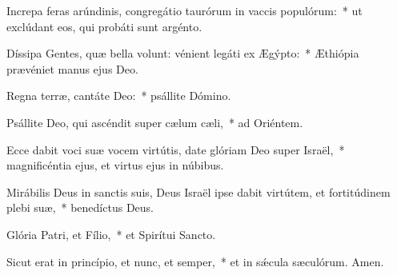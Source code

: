 \item Increpa feras arúndinis, congregátio taurórum in vaccis populórum:~* ut exclúdant eos, qui probáti sunt argénto.

\item Díssipa Gentes, quæ bella volunt: vénient legáti ex Ægýpto:~* Æthiópia prævéniet manus ejus Deo.

\item Regna terræ, cantáte Deo:~* psállite Dómino.

\item Psállite Deo, qui ascéndit super cælum cæli,~* ad Oriéntem.

\item Ecce dabit voci suæ vocem virtútis, date glóriam Deo super Israël,~* magnificéntia ejus, et virtus ejus in núbibus.

\item Mirábilis Deus in sanctis suis, Deus Israël ipse dabit virtútem, et fortitúdinem plebi suæ,~* benedíctus Deus.

\item Glória Patri, et Fílio,~* et Spirítui Sancto.

\item Sicut erat in princípio, et nunc, et semper,~* et in sǽcula sæculórum. Amen.

